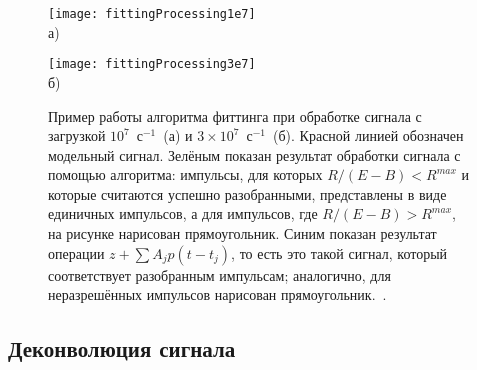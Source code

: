 \begin{figure}[ht]
    \begin{minipage}[b][][b]{0.95\linewidth}\centering
        \texttt{[image: fittingProcessing1e7]} \\ а)
    \end{minipage}
    \vfill
    \begin{minipage}[b][][b]{0.95\linewidth}\centering
        \texttt{[image: fittingProcessing3e7]} \\ б)
    \end{minipage}
    \vspace{5mm}
    \caption{ Пример работы алгоритма фиттинга при обработке сигнала с загрузкой $10^7$~с${}^{-1}$~(а) и $3 \times 10^7$~с${}^{-1}$~(б). Красной линией обозначен модельный сигнал. Зелёным показан результат обработки сигнала с помощью алгоритма: импульсы, для которых $R/(E-B)<R^{max}$ и которые считаются успешно разобранными, представлены в виде единичных импульсов, а для импульсов, где $R/(E-B)>R^{max}$, на рисунке нарисован прямоугольник. Синим показан результат операции $z + \sum A_j p(t - t_j)$, то есть это такой сигнал, который соответствует разобранным импульсам; аналогично, для неразрешённых импульсов нарисован прямоугольник.~\cite{Khilkevitch2020}. }
    \label{fig:FittingProcessing}
\end{figure}



\FloatBarrier
\subsection{Деконволюция сигнала}

